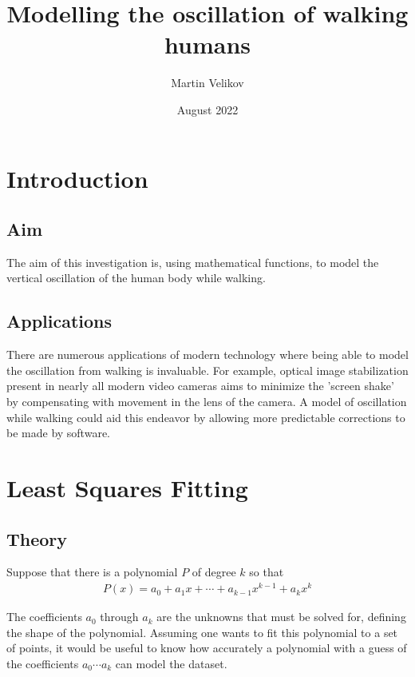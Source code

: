 \documentclass[12pt, a4paper, twoside]{article}
\title{Modelling the oscillation of walking humans}
\author{Martin Velikov}
\date{August 2022}
\begin{document}
\maketitle
\tableofcontents

\section{Introduction}
\subsection{Aim}
The aim of this investigation is, using mathematical functions, to model the
vertical oscillation of the human body while walking.

\subsection{Applications}
There are numerous applications of modern technology where being able to model the
oscillation from walking is invaluable. For example, optical image stabilization
present in nearly all modern video cameras aims to minimize the 'screen shake' by
compensating with movement in the lens of the camera. A model of oscillation while
walking could aid this endeavor by allowing more predictable corrections to be made
by software.

\section{Least Squares Fitting}
\subsection{Theory}

Suppose that there is a polynomial $P$ of degree $k$ so that
\begin{align*}
    P(x)= a_0 + a_1 x + \cdots + a_{k-1} x^{k-1} + a_k x^k
\end{align*}

The coefficients $a_0$ through $a_k$ are the unknowns that must be solved for,
defining the shape of the polynomial. Assuming one wants to fit this polynomial
to a set of points, it would be useful to know how accurately a polynomial with
a guess of the coefficients $a_0 \cdots a_k$  can model the dataset. \\
\end{document}
